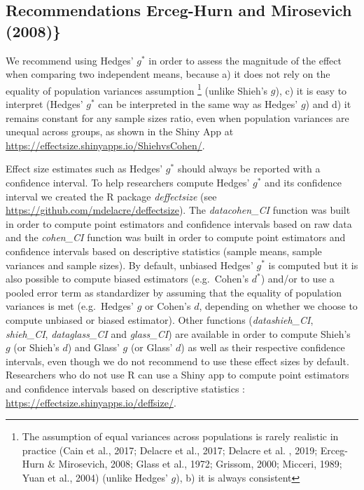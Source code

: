 \documentclass[
  english,
  man,floatsintext]{apa6}
\begin{document}
\hypertarget{recommendations-erceg-hurn_modern_2008}{%
\subsection{\texorpdfstring{Recommendations \color{white} Erceg-Hurn and Mirosevich (2008)\}}{Recommendations  Erceg-Hurn and Mirosevich (2008)\}}}\label{recommendations-erceg-hurn_modern_2008}}

\color{black}We recommend using Hedges' \(g^*\) in order to assess the magnitude of the effect when comparing two independent means, because a) it does not rely on the equality of population variances assumption \footnote{The assumption of equal variances across populations is rarely realistic in practice (Cain et al., 2017; Delacre et al., 2017; Delacre et al. , 2019; Erceg-Hurn $\&$ Mirosevich, 2008; Glass et al., 1972; Grissom, 2000; Micceri, 1989; Yuan et al., 2004) (unlike Hedges' $g$), b) it is always consistent} (unlike Shieh's \(g\)), c) it is easy to interpret (Hedges' \(g^*\) can be interpreted in the same way as Hedges' \(g\)) and d) it remains constant for any sample sizes ratio, even when population variances are unequal across groups, as shown in the Shiny App at \url{https://effectsize.shinyapps.io/ShiehvsCohen/}.

Effect size estimates such as Hedges' \(g^*\) should always be reported with a confidence interval. To help researchers compute Hedges' \(g^*\) and its confidence interval we created the R package \emph{deffectsize} (see \url{https://github.com/mdelacre/deffectsize}). The \emph{datacohen\_CI} function was built in order to compute point estimators and confidence intervals based on raw data and the \emph{cohen\_CI} function was built in order to compute point estimators and confidence intervals based on descriptive statistics (sample means, sample variances and sample sizes). By default, unbiased Hedges' \(g^*\) is computed but it is also possible to compute biased estimators (e.g.~Cohen's \(d^*\)) and/or to use a pooled error term as standardizer by assuming that the equality of population variances is met (e.g.~Hedges' \(g\) or Cohen's \(d\), depending on whether we choose to compute unbiased or biased estimator). Other functions (\emph{datashieh\_CI}, \emph{shieh\_CI}, \emph{dataglass\_CI} and \emph{glass\_CI}) are available in order to compute Shieh's \(g\) (or Shieh's \(d\)) and Glass' \(g\) (or Glass' \(d\)) as well as their respective confidence intervals, even though we do not recommend to use these effect sizes by default. Researchers who do not use R can use a Shiny app to compute point estimators and confidence intervals based on descriptive statistics : \url{https://effectsize.shinyapps.io/deffsize/}.
\end{document}

